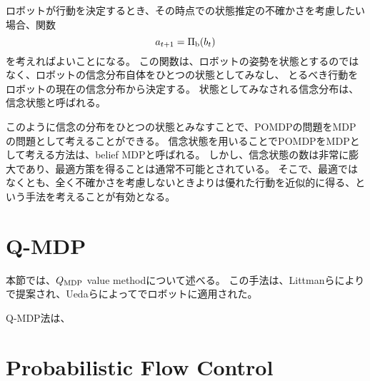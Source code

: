ロボットが行動を決定するとき、その時点での状態推定の不確かさを考慮したい場合、関数
\begin{equation}
\label{policy belief}
  a_{t+1} = \Pi_{\rm b} (b_{t})
\end{equation}
を考えればよいことになる。
この関数は、ロボットの姿勢を状態とするのではなく、ロボットの信念分布自体をひとつの状態としてみなし、
とるべき行動をロボットの現在の信念分布から決定する。
状態としてみなされる信念分布は、信念状態と呼ばれる。

このように信念の分布をひとつの状態とみなすことで、POMDPの問題をMDPの問題として考えることができる。
信念状態を用いることでPOMDPをMDPとして考える方法は、belief MDPと呼ばれる\cite{kaelbling1998}。
しかし、信念状態の数は非常に膨大であり、最適方策を得ることは通常不可能とされている。
そこで、最適ではなくとも、全く不確かさを考慮しないときよりは優れた行動を近似的に得る、という手法を考えることが有効となる。


\section{Q-MDP} \label{section:q-mdp}
本節では、$Q_{\rm MDP}$ value methodについて述べる。
この手法は、Littmanらにより\cite{littman1995}で提案され、Uedaらによって\cite{}でロボットに適用された。

Q-MDP法は、


\section{Probabilistic Flow Control} \label{section:PFC法}

